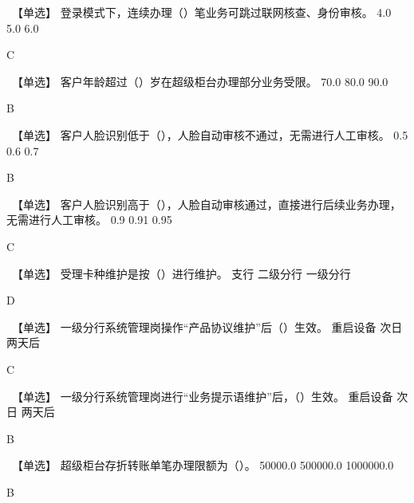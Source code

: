 \documentclass[kindlepaper]{BHCexam4kindle}
\begin{document}
\begin{questions}
\qs　【单选】 登录模式下，连续办理（）笔业务可跳过联网核查、身份审核。 \xx
{} {  4.0 } { 5.0 } { 6.0 }
\begin{solution} C \end{solution}
\qs　【单选】 客户年龄超过（）岁在超级柜台办理部分业务受限。 \xx
{} {  70.0 } { 80.0 } { 90.0 }
\begin{solution} B \end{solution}
\qs　【单选】 客户人脸识别低于（），人脸自动审核不通过，无需进行人工审核。 \xx
{} {  0.5 } { 0.6 } { 0.7 }
\begin{solution} B \end{solution}
\qs　【单选】 客户人脸识别高于（），人脸自动审核通过，直接进行后续业务办理，无需进行人工审核。 \xx
{} {  0.9 } { 0.91 } { 0.95 }
\begin{solution} C \end{solution}
\qs　【单选】 受理卡种维护是按（）进行维护。 \xx
{} {  支行 } { 二级分行 } { 一级分行 }
\begin{solution} D \end{solution}
\qs　【单选】 一级分行系统管理岗操作“产品协议维护”后（）生效。 \xx
{} {  重启设备 } { 次日 } { 两天后 }
\begin{solution} C \end{solution}
\qs　【单选】 一级分行系统管理岗进行“业务提示语维护”后，（）生效。 \xx
{} {  重启设备 } { 次日 } { 两天后 }
\begin{solution} B \end{solution}
\qs　【单选】 超级柜台存折转账单笔办理限额为（）。 \xx
{} {  50000.0 } { 500000.0 } { 1000000.0 }
\begin{solution} B \end{solution}

\end{questions}
\end{document}
